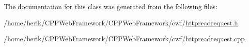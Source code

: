 The documentation for this class was generated from the following files\+:\begin{DoxyCompactItemize}
\item 
/home/herik/\+C\+P\+P\+Web\+Framework/\+C\+P\+P\+Web\+Framework/cwf/\hyperlink{httpreadrequest_8h}{httpreadrequest.\+h}\item 
/home/herik/\+C\+P\+P\+Web\+Framework/\+C\+P\+P\+Web\+Framework/cwf/\hyperlink{httpreadrequest_8cpp}{httpreadrequest.\+cpp}\end{DoxyCompactItemize}
